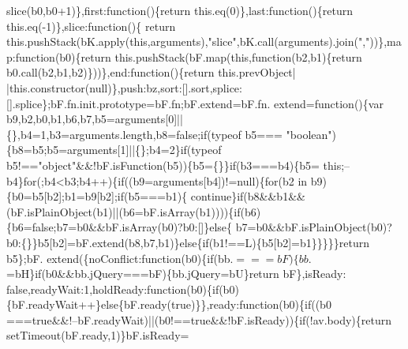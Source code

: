 \begin{DoxyCode}
      slice(b0,b0+1)\},first:function()\{\textcolor{keywordflow}{return} this.eq(0)\},last:\textcolor{keyword}{function}()\{\textcolor{keywordflow}{return} this.eq(-1)\},slice:\textcolor{keyword}{function}()\{\textcolor{keywordflow}{
      return} this.pushStack(bK.apply(\textcolor{keyword}{this},arguments),\textcolor{stringliteral}{"slice"},bK.call(arguments).join(\textcolor{stringliteral}{","}))\},map:\textcolor{keyword}{function}(b0)\{\textcolor{keywordflow}{return} 
      this.pushStack(bF.map(\textcolor{keyword}{this},\textcolor{keyword}{function}(b2,b1)\{\textcolor{keywordflow}{return} b0.call(b2,b1,b2)\}))\},end:\textcolor{keyword}{function}()\{\textcolor{keywordflow}{return} this.prevObject|
      |this.constructor(null)\},push:bz,sort:[].sort,splice:[].splice\};bF.fn.init.prototype=bF.fn;bF.extend=bF.fn.
      extend=\textcolor{keyword}{function}()\{var b9,b2,b0,b1,b6,b7,b5=arguments[0]||\{\},b4=1,b3=arguments.length,b8=\textcolor{keyword}{false};\textcolor{keywordflow}{if}(typeof b5===\textcolor{stringliteral}{
      "boolean"})\{b8=b5;b5=arguments[1]||\{\};b4=2\}\textcolor{keywordflow}{if}(typeof b5!==\textcolor{stringliteral}{"object"}&&!bF.isFunction(b5))\{b5=\{\}\}\textcolor{keywordflow}{if}(b3===b4)\{b5=\textcolor{keyword}{
      this};--b4\}\textcolor{keywordflow}{for}(;b4<b3;b4++)\{\textcolor{keywordflow}{if}((b9=arguments[b4])!=null)\{\textcolor{keywordflow}{for}(b2 in b9)\{b0=b5[b2];b1=b9[b2];\textcolor{keywordflow}{if}(b5===b1)\{\textcolor{keywordflow}{
      continue}\}\textcolor{keywordflow}{if}(b8&&b1&&(bF.isPlainObject(b1)||(b6=bF.isArray(b1))))\{\textcolor{keywordflow}{if}(b6)\{b6=\textcolor{keyword}{false};b7=b0&&bF.isArray(b0)?b0:[]\}\textcolor{keywordflow}{else}\{
      b7=b0&&bF.isPlainObject(b0)?b0:\{\}\}b5[b2]=bF.extend(b8,b7,b1)\}\textcolor{keywordflow}{else}\{\textcolor{keywordflow}{if}(b1!==L)\{b5[b2]=b1\}\}\}\}\}\textcolor{keywordflow}{return} b5\};bF.
      extend(\{noConflict:\textcolor{keyword}{function}(b0)\{\textcolor{keywordflow}{if}(bb.$===bF)\{bb.$=bH\}\textcolor{keywordflow}{if}(b0&&bb.jQuery===bF)\{bb.jQuery=bU\}\textcolor{keywordflow}{return} bF\},isReady:\textcolor{keyword}{
      false},readyWait:1,holdReady:\textcolor{keyword}{function}(b0)\{\textcolor{keywordflow}{if}(b0)\{bF.readyWait++\}\textcolor{keywordflow}{else}\{bF.ready(\textcolor{keyword}{true})\}\},ready:\textcolor{keyword}{function}(b0)\{\textcolor{keywordflow}{if}((b0
      ===\textcolor{keyword}{true}&&!--bF.readyWait)||(b0!==\textcolor{keyword}{true}&&!bF.isReady))\{\textcolor{keywordflow}{if}(!av.body)\{\textcolor{keywordflow}{return} setTimeout(bF.ready,1)\}bF.isReady=\textcolor{keyword}{
}
\end{DoxyCode}
